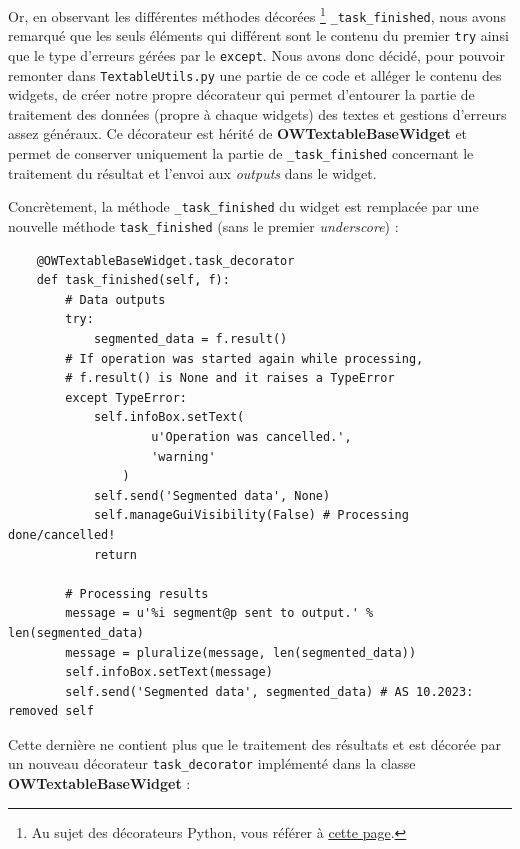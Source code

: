 \documentclass{article}
\begin{document}
Or, en observant les différentes méthodes décorées \footnote{Au sujet des décorateurs Python, vous référer à \href{https://www.geeksforgeeks.org/decorators-in-python/}{cette page}.} \texttt{\_task\_finished}, nous avons remarqué que les seuls éléments qui différent sont le contenu du premier \texttt{try} ainsi que le type d'erreurs gérées par le \texttt{except}. Nous avons donc décidé, pour pouvoir remonter dans \texttt{TextableUtils.py} une partie de ce code et alléger le contenu des widgets, de créer notre propre décorateur qui permet d'entourer la partie de traitement des données (propre à chaque widgets) des textes et gestions d'erreurs assez généraux. Ce décorateur est hérité de \textbf{OWTextableBaseWidget} et permet de conserver uniquement la partie de \texttt{\_task\_finished} concernant le traitement du résultat et l'envoi aux \textit{outputs} dans le widget.

Concrètement, la méthode \texttt{\_task\_finished} du widget est remplacée par une nouvelle méthode \texttt{task\_finished} (sans le premier \textit{underscore}) : 

\begin{verbatim}
    @OWTextableBaseWidget.task_decorator
    def task_finished(self, f):
        # Data outputs
        try:
            segmented_data = f.result()
        # If operation was started again while processing,
        # f.result() is None and it raises a TypeError
        except TypeError:
            self.infoBox.setText(
                    u'Operation was cancelled.',
                    'warning'
                )
            self.send('Segmented data', None)
            self.manageGuiVisibility(False) # Processing done/cancelled!
            return

        # Processing results
        message = u'%i segment@p sent to output.' % len(segmented_data)
        message = pluralize(message, len(segmented_data))
        self.infoBox.setText(message)
        self.send('Segmented data', segmented_data) # AS 10.2023: removed self
\end{verbatim}

Cette dernière ne contient plus que le traitement des résultats et est décorée par un nouveau décorateur \texttt{task\_decorator} implémenté dans la classe \textbf{OWTextableBaseWidget} : 
\end{document}
